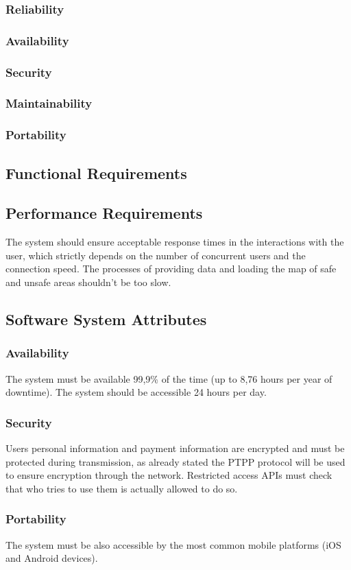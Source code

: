 \subsubsection{Reliability}
\subsubsection{Availability}
\subsubsection{Security}
\subsubsection{Maintainability}
\subsubsection{Portability}





\subsection{Functional Requirements}


  	
\subsection{Performance Requirements}
	The system should ensure acceptable response times in the interactions with the user, which strictly depends on the number of concurrent users and the connection speed.
\newline
The processes of providing data and loading the map of safe and unsafe areas shouldn't be too slow.
\subsection{Software System Attributes}
	\subsubsection{Availability}
	The system must be available 99,9\% of the time (up to 8,76 hours per year of downtime). The system should be accessible 24 hours per day.
	\subsubsection{Security}
	Users personal information and payment information are encrypted and must be protected during transmission, as already stated the PTPP protocol will be used to ensure encryption through the network.
	Restricted access APIs must check that who tries to use them is actually allowed to do so.
	\subsubsection{Portability}
	The system must be also accessible by the most common mobile platforms (iOS and Android devices).

